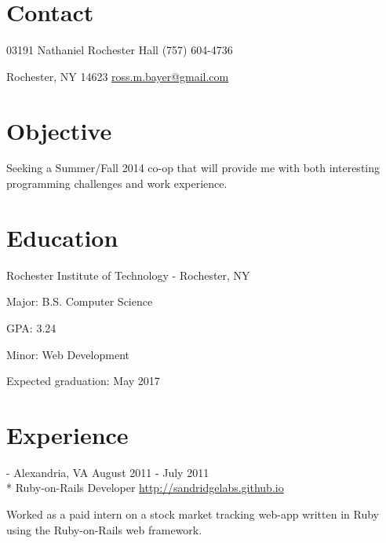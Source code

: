 \documentclass[letterpaper,margin,line,11pt]{resume}
\newcommand{\rurl}[1]{\hfill {\footnotesize \url{#1}}}
\newcommand{\rdate}[1]{\hfill {\small #1}}
\renewcommand{\employer}[5]{\item[#1] - #2 \rdate{#3} \\* #4 \rurl{#5}}
\begin{document}
\begin{resume}

\section{\mysidestyle Contact} 
	\begin{asparablank}
		\item 03191 Nathaniel Rochester Hall \hfill (757) 604-4736
		\item Rochester, NY 14623 \hfill \href{mailto:ross.m.bayer@gmail.com}{ross.m.bayer@gmail.com}
	\end{asparablank}

\section{\mysidestyle Objective}
	Seeking a Summer/Fall 2014 co-op that will provide me with both interesting programming challenges and work experience.

\section{\mysidestyle Education}
	\begin{compactdesc}
		\item[Rochester Institute of Technology] - Rochester, NY 
		\begin{compactitem} {
			\item Major: B.S. Computer Science
			\item GPA: 3.24
			\item Minor: Web Development
			\item Expected graduation: May 2017
		} \end{compactitem}
	\end{compactdesc}

\section{\mysidestyle Experience}
	\begin{asparadesc}
		\employer{Sandridge Labs}{Alexandria, VA}{August 2011 - July 2011}{Ruby-on-Rails Developer}{http://sandridgelabs.github.io}

		Worked as a paid intern on a stock market tracking web-app written in Ruby using the Ruby-on-Rails web framework.
		\normalsize
	\end{asparadesc}


\end{resume}
\end{document}

